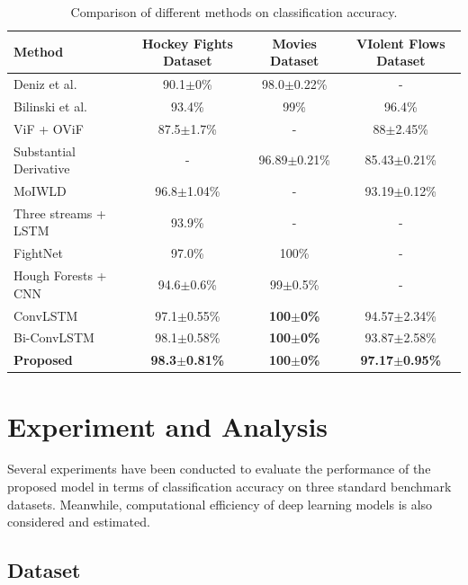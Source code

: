 \documentclass[10pt,twocolumn,letterpaper]{article}
\begin{document}
\begin{table}
\begin{center}
\caption{Comparison of different methods on classification accuracy.}
\label{table:result}
\begin{tabular}{lccc}
\hline
\textbf{Method} & \textbf{Hockey Fights Dataset} & \textbf{Movies Dataset} & \textbf{VIolent Flows Dataset} \\
\hline\hline
Deniz et al. \cite{fast} & 90.1$\pm$0\% & 98.0$\pm$0.22\% & - \\
Bilinski et al. \cite{bilinski2016human} & 93.4\% & 99\% & 96.4\% \\
ViF + OViF \cite{ovif} & 87.5$\pm$1.7\% & - & 88$\pm$2.45\% \\
Substantial Derivative \cite{moha_avss} & - & 96.89$\pm$0.21\% & 85.43$\pm$0.21\% \\
MoIWLD \cite{MoIWLD} & 96.8$\pm$1.04\% & - & 93.19$\pm$0.12\% \\
\hline
Three streams + LSTM \cite{dong2016multi} & 93.9\% & - & - \\
FightNet \cite{zhou2017violent} & 97.0\% & 100\% & - \\
Hough Forests + CNN \cite{serrano2018fight} & 94.6$\pm$0.6\% & 99$\pm$0.5\% & - \\
ConvLSTM \cite{convlstm_sudh} & 97.1$\pm$0.55\% & \textbf{100$\pm$0\%} & 94.57$\pm$2.34\% \\
Bi-ConvLSTM \cite{bi_convlstm} & 98.1$\pm$0.58\% & \textbf{100$\pm$0\%} & 93.87$\pm$2.58\% \\
\textbf{Proposed} & \textbf{98.3$\pm$0.81\%} & \textbf{100$\pm$0\%} & \textbf{97.17$\pm$0.95\%} \\
\hline
\end{tabular}
\end{center}
\end{table}


\section{Experiment and Analysis}

Several experiments have been conducted to evaluate the performance of the proposed model in terms of classification accuracy on three standard benchmark datasets. Meanwhile, computational efficiency of deep learning models is also considered and estimated.

\subsection{Dataset}
\end{document}
